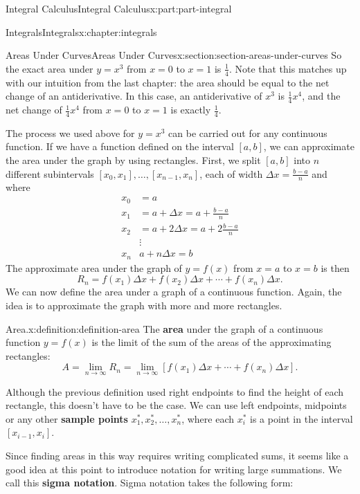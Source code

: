 \documentclass[twoside,10pt,]{tufte-book}
\newcommand{\terminology}[1]{\textbf{#1}}
\numberwithin{equation}{part}
\begin{document}
\begin{partptx}{Integral Calculus}{}{Integral Calculus}{}{}{x:part:part-integral}
\begin{chapterptx}{Integrals}{}{Integrals}{}{}{x:chapter:integrals}
\begin{sectionptx}{Areas Under Curves}{}{Areas Under Curves}{}{}{x:section:section-areas-under-curves}
So the exact area under \(y = x^{3}\) from \(x=0\) to \(x=1\) is \(\frac{1}{4}\). Note that this matches up with our intuition from the last chapter: the area should be equal to the net change of an antiderivative. In this case, an antiderivative of \(x^{3}\) is \(\frac{1}{4}x^{4}\), and the net change of \(\frac{1}{4}x^{4}\) from \(x=0\) to \(x=1\) is exactly \(\frac{1}{4}\).%
\par
The process we used above for \(y = x^{3}\) can be carried out for any continuous function. If we have a function defined on the interval \([a,b]\), we can approximate the area under the graph by using rectangles. First, we split \([a,b]\) into \(n\) different subintervals \([x_{0},x_{1}],\ldots,[x_{n-1},x_{n}]\), each of width \(\Delta x = \frac{b-a}{n}\) and where%
\begin{align*}
x_{0} & = a \\
x_{1} & = a + \Delta x = a+\frac{b-a}{n} \\
x_{2} & = a + 2\Delta x = a + 2\frac{b-a}{n}\\
& \vdots \\
x_{n} & a+n\Delta x = b
\end{align*}
The approximate area under the graph of \(y=f(x)\) from \(x=a\) to \(x=b\) is then%
\begin{equation*}
R_{n} = f(x_{1})\Delta x + f(x_{2})\Delta x + \cdots + f(x_{n})\Delta x.
\end{equation*}
We can now define the area under a graph of a continuous function. Again, the idea is to approximate the graph with more and more rectangles.%
\begin{definition}{Area.}{x:definition:definition-area}%
The \terminology{area} under the graph of a continuous function \(y=f(x)\) is the limit of the sum of the areas of the approximating rectangles:%
\begin{equation*}
A = \lim_{n\to\infty}R_{n} = \lim_{n\to\infty}[f(x_{1})\Delta x + \cdots + f(x_{n})\Delta x].
\end{equation*}
%
\end{definition}
Although the previous definition used right endpoints to find the height of each rectangle, this doesn't have to be the case. We can use left endpoints, midpoints or any other \terminology{sample points} \(x_{1}^{*}, x_{2}^{*},\ldots,x_{n}^{*}\), where each \(x_{i}^{*}\) is a point in the interval \([x_{i-1},x_{i}].\)%
\par
Since finding areas in this way requires writing complicated sums, it seems like a good idea at this point to introduce notation for writing large summations. We call this \terminology{sigma notation}. Sigma notation takes the following form:%

\end{sectionptx}
\end{chapterptx}
\end{partptx}
\end{document}
